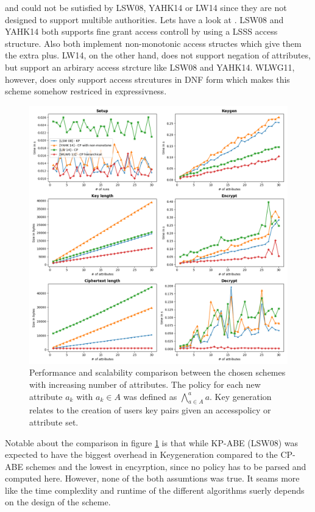  and  could not be sutisfied by LSW08, YAHK14 or LW14 since they are not designed to support multible authorities. 
Lets have a look at . LSW08 and YAHK14 both supports fine grant access controll by using a \ac{LSSS} access structure. Also both implement non-monotonic access structes which give them the extra plus. LW14, on the other hand, does not support negation of attributes, but support an arbirary access strcture like LSW08 and YAHK14. WLWG11, however, does only support access strcutures in \ac{DNF} form which makes this scheme somehow restriced in expressivness. 

\begin{figure}[!ht]
\centering
    \includegraphics[width=1\linewidth]{img/basic_abe_comparisons.png}
    \caption{Performance and scalability comparison between the chosen schemes with increasing number of attributes. The policy for each new attribute $a_k$ with $a_k \in A$ was defined as $\bigwedge\limits_{a \in A}^a a$. Key generation relates to the creation of users key pairs given an accesspolicy or attribute set.}
    \label{fig:basic_abe_comparison}
\end{figure}

Notable about the comparison in figure \ref{fig:basic_abe_comparison} is that while \ac{KP-ABE} (LSW08) was expected to have the biggest overhead in Keygeneration compared to the \ac{CP-ABE} schemes and the lowest in encyrption, since no policy has to be parsed and computed here. However, none of the both assumtions was true. It seams more like the time complexlity and runtime of the different algorithms suerly depends on the design of the scheme. 

